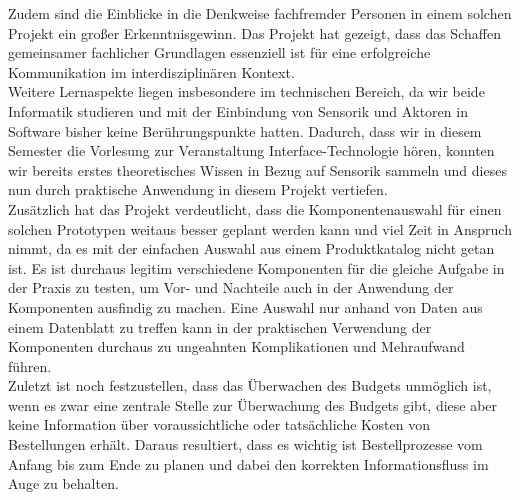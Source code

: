     Zudem sind die Einblicke in die Denkweise fachfremder Personen in einem solchen Projekt ein großer Erkenntnisgewinn. Das Projekt hat gezeigt, dass das Schaffen gemeinsamer fachlicher Grundlagen essenziell ist für eine erfolgreiche Kommunikation im interdisziplinären Kontext.\\

    Weitere Lernaspekte liegen insbesondere im technischen Bereich, da wir beide Informatik studieren und mit der Einbindung von Sensorik und Aktoren in Software bisher keine Berührungspunkte hatten. Dadurch, dass wir in diesem Semester die Vorlesung zur Veranstaltung Interface-Technologie hören, konnten wir bereits erstes theoretisches Wissen in Bezug auf Sensorik sammeln und dieses nun durch praktische Anwendung in diesem Projekt vertiefen.\\

    Zusätzlich hat das Projekt verdeutlicht, dass die Komponentenauswahl für einen solchen Prototypen weitaus besser geplant werden kann und viel Zeit in Anspruch nimmt, da es mit der einfachen Auswahl aus einem Produktkatalog nicht getan ist. Es ist durchaus legitim verschiedene Komponenten für die gleiche Aufgabe in der Praxis zu testen, um Vor- und Nachteile auch in der Anwendung der Komponenten ausfindig zu machen. Eine Auswahl nur anhand von Daten aus einem Datenblatt zu treffen kann in der praktischen Verwendung der Komponenten durchaus zu ungeahnten Komplikationen und Mehraufwand führen.\\

    Zuletzt ist noch festzustellen, dass das Überwachen des Budgets unmöglich ist, wenn es zwar eine zentrale Stelle zur Überwachung des Budgets gibt, diese aber keine Information über voraussichtliche oder tatsächliche Kosten von Bestellungen erhält. Daraus resultiert, dass es wichtig ist Bestellprozesse vom Anfang bis zum Ende zu planen und dabei den korrekten Informationsfluss im Auge zu behalten.